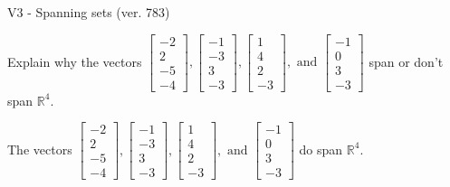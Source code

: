 \begin{exercise}
  \begin{exerciseTitle}V3 - Spanning sets (ver. 783)\end{exerciseTitle}
  \begin{exerciseStatement}
    Explain why the vectors \(\left[\begin{array}{r}
-2 \\
2 \\
-5 \\
-4
\end{array}\right] , \left[\begin{array}{r}
-1 \\
-3 \\
3 \\
-3
\end{array}\right] , \left[\begin{array}{r}
1 \\
4 \\
2 \\
-3
\end{array}\right] , \text{ and } \left[\begin{array}{r}
-1 \\
0 \\
3 \\
-3
\end{array}\right]\) span or don't span \(\mathbb{R}^4\). 
	


  \end{exerciseStatement}
  \begin{exerciseAnswer}
   The vectors \(\left[\begin{array}{r}
-2 \\
2 \\
-5 \\
-4
\end{array}\right] , \left[\begin{array}{r}
-1 \\
-3 \\
3 \\
-3
\end{array}\right] , \left[\begin{array}{r}
1 \\
4 \\
2 \\
-3
\end{array}\right] , \text{ and } \left[\begin{array}{r}
-1 \\
0 \\
3 \\
-3
\end{array}\right]\) 
  	 do  
	span \(\mathbb{R}^4\).
  


  \end{exerciseAnswer}
\end{exercise}